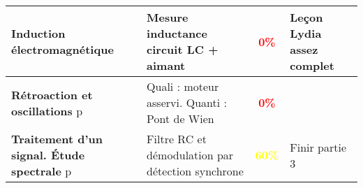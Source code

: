 \begin{changemargin}{-1.5cm}{-0cm}
\begin{center}
\begin{tabularx}{\paperwidth-2cm}{| X | X | c | X |}
  \hline 
  \textbf{Induction électromagnétique} & Mesure inductance circuit LC + aimant & \textcolor{red}{\textbf{0\%}} & Leçon Lydia assez complet\\
  \hline
  \textbf{Rétroaction et oscillations} p\pageref{LP_RetroactionOscillation} & Quali : moteur asservi. Quanti : Pont de Wien & \textcolor{red}{\textbf{0\%}} & \\
  \hline
  \textbf{Traitement d'un signal. Étude spectrale} p\pageref{LP_TraitementSignal} & Filtre RC et démodulation par détection synchrone & \textcolor{yellow}{\textbf{60\%}} & Finir partie 3\\
  \hline
  
\end{tabularx}
\end{center}






\end{changemargin}
